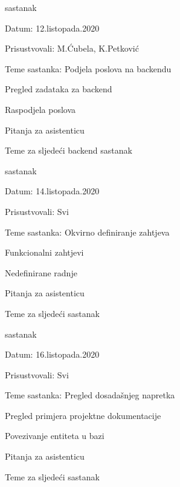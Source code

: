\begin{packed_enum}
			\item  sastanak
			\item[] \begin{packed_item}
				\item Datum: 12.listopada.2020
				\item Prisustvovali:  M.Ćubela, K.Petković
				\item Teme sastanka: Podjela poslova na backendu
				\begin{packed_item}
					\item Pregled zadataka za backend
					\item Raspodjela poslova
					\item Pitanja za asistenticu
					\item Teme za sljedeći backend sastanak
				\end{packed_item}
			\end{packed_item}
			
			
			
			\item  sastanak
			\item[] \begin{packed_item}
				\item Datum: 14.listopada.2020
				\item Prisustvovali: Svi
				\item Teme sastanka: Okvirno definiranje zahtjeva
				\begin{packed_item}
					\item Funkcionalni zahtjevi
					\item Nedefinirane radnje
					\item Pitanja za asistenticu
					\item Teme za sljedeći sastanak
				\end{packed_item}
			\end{packed_item}
			
				
			\item  sastanak
			\item[] \begin{packed_item}
				\item Datum: 16.listopada.2020
				\item Prisustvovali: Svi
				\item Teme sastanka: Pregled dosadašnjeg napretka
				\begin{packed_item}
					\item Pregled primjera projektne dokumentacije
					\item Povezivanje entiteta u bazi
					\item Pitanja za asistenticu
					\item Teme za sljedeći sastanak
				\end{packed_item}
			\end{packed_item}
			

\end{packed_enum}
